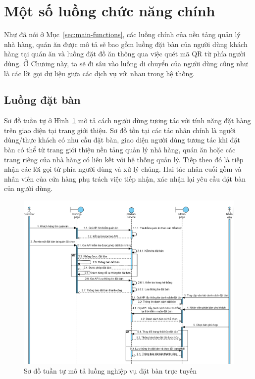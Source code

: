 \section{Một số luồng chức năng chính}\label{sec:user-flow-examples}
Như đã nói ở Mục~\ref{sec:main-functions}, các luồng chính của nền tảng quản lý nhà hàng, quán ăn được mô tả sẽ bao gồm luồng đặt bàn của người dùng khách hàng tại quán ăn và luồng đặt đồ ăn thông qua việc quét mã QR từ phía người dùng.
Ở Chương này, ta sẽ đi sâu vào luồng di chuyển của người dùng cũng như là các lời gọi dữ liệu giữa các dịch vụ với nhau trong hệ thống.
\subsection{Luồng đặt bàn}\label{sec:reservation-sequence-flow}
Sơ đồ tuần tự ở Hình~\ref{fig:reservation-sequence-flow} mô tả cách người dùng tương tác với tính năng đặt hàng trên giao diện tại trang giới thiệu.
Sơ đồ tồn tại các tác nhân chính là người dùng/thực khách có nhu cầu đặt bàn, giao diện người dùng tương tác khi đặt bàn có thể từ trang giới thiệu nền tảng quản lý nhà hàng, quán ăn hoặc các trang riêng của nhà hàng có liên kết với hệ thống quản lý.
Tiếp theo đó là  tiếp nhận các lời gọi từ phía người dùng và xử lý chúng.
Hai tác nhân cuối gồm  và nhân viên của cửa hàng phụ trách việc tiếp nhận, xác nhận lại yêu cầu đặt bàn của người dùng.

\begin{figure}[h]
	\centering
	\includegraphics[width=\textwidth]{images/hChip/main-flow/reservation.png}
	\caption{Sơ đồ tuần tự mô tả luồng nghiệp vụ đặt bàn trực tuyến}
	\label{fig:reservation-sequence-flow}
\end{figure}

